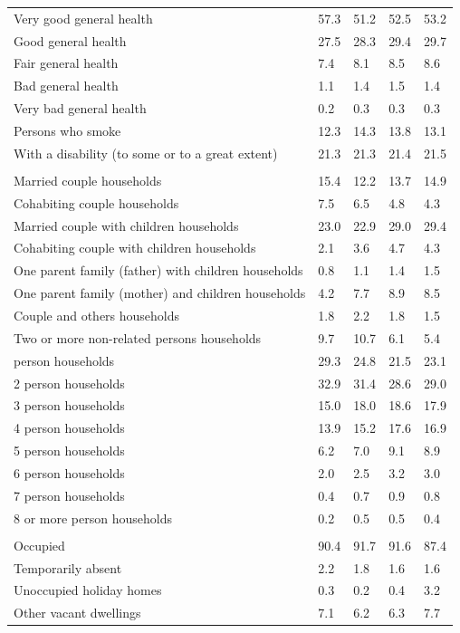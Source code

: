 \documentclass{article}
\begin{document}
\begin{table}[h]
\begin{tabular}{KTTTT}
    \hline
Very good general health & 57.3& 51.2&52.5& 53.2\\
Good general health & 27.5& 28.3& 29.4& 29.7\\
Fair general health & 7.4& 8.1&8.5& 8.6\\
Bad general health & 1.1& 1.4&1.5& 1.4\\
Very bad general health & 0.2& 0.3&0.3& 0.3\\
    \hline
Persons who smoke & 12.3& 14.3&13.8& 13.1\\
    \hline
With a disability (to some or to a great extent) & 21.3& 21.3&21.4& 21.5\\
\hline
    \\ 
    \hline
Married couple households & 15.4& 12.2& 13.7& 14.9\\
Cohabiting couple households & 7.5& 6.5& 4.8& 4.3\\
Married couple with children households & 23.0& 22.9& 29.0& 29.4\\
Cohabiting couple with children households & 2.1& 3.6& 4.7& 4.3\\
One parent family (father) with  children households & 0.8& 1.1& 1.4& 1.5\\
One parent family (mother) and children households & 4.2& 7.7& 8.9& 8.5\\
Couple and others households  & 1.8& 2.2& 1.8& 1.5\\
Two or more non-related persons households &  9.7& 10.7&  6.1&  5.4\\
     person households & 29.3& 24.8& 21.5& 23.1\\
2 person households & 32.9& 31.4& 28.6& 29.0\\
3 person households & 15.0& 18.0& 18.6& 17.9\\
4 person households & 13.9& 15.2& 17.6& 16.9\\
5 person households & 6.2& 7.0& 9.1& 8.9\\
6 person households & 2.0& 2.5& 3.2& 3.0\\
7 person households & 0.4& 0.7& 0.9& 0.8\\
8 or more person households & 0.2& 0.5& 0.5& 0.4\\
\hline
    \\ 
    \hline
Occupied & 90.4& 91.7& 91.6& 87.4\\
Temporarily absent & 2.2& 1.8& 1.6& 1.6\\
Unoccupied holiday homes & 0.3& 0.2& 0.4& 3.2\\
Other vacant dwellings & 7.1& 6.2& 6.3& 7.7\\
\hline
\end{tabular}
\end{table}
\end{document}
